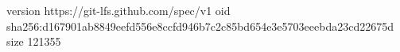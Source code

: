 version https://git-lfs.github.com/spec/v1
oid sha256:d167901ab8849eefd556e8ccfd946b7c2c85bd654e3e5703eeebda23cd22675d
size 121355
